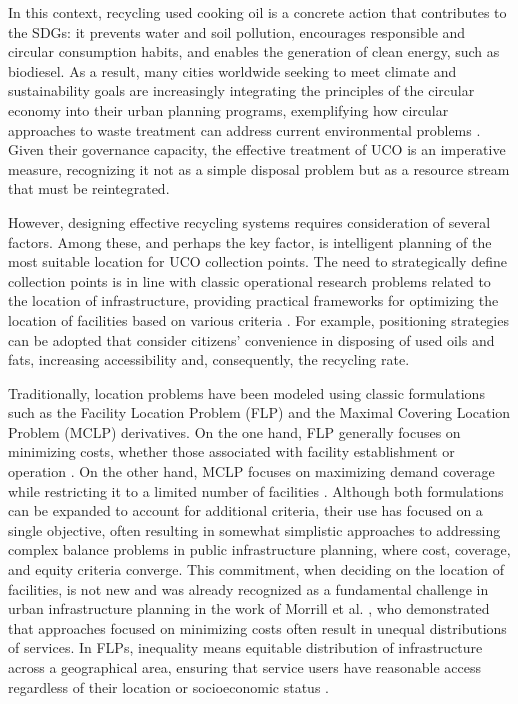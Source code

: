 In this context, recycling used cooking oil is a concrete action that contributes to the SDGs: it prevents water and soil pollution, encourages responsible and circular consumption habits, and enables the generation of clean energy, such as biodiesel. As a result, many cities worldwide seeking to meet climate and sustainability goals are increasingly integrating the principles of the circular economy into their urban planning programs, exemplifying how circular approaches to waste treatment can address current environmental problems \cite{petit2018circular}. Given their governance capacity, the effective treatment of UCO is an imperative measure, recognizing it not as a simple disposal problem but as a resource stream that must be reintegrated. 

However, designing effective recycling systems requires consideration of several factors. Among these, and perhaps the key factor, is intelligent planning of the most suitable location for UCO collection points. The need to strategically define collection points is in line with classic operational research problems related to the location of infrastructure, providing practical frameworks for optimizing the location of facilities 
based on various criteria \cite{gallego2024metaheuristic,hale2003location,karpova2025multi,vecina2025enhancing}. For example, positioning strategies can be adopted that consider citizens' convenience in disposing of used oils and fats, increasing accessibility and, consequently, the recycling rate. 

Traditionally, location problems have been modeled using classic formulations such as the Facility Location Problem (FLP) and the Maximal Covering Location Problem (MCLP) derivatives. On the one hand, FLP generally focuses on minimizing costs, whether those associated with facility establishment or operation \cite{adeleke2020facility}. On the other hand, MCLP focuses on maximizing demand coverage while restricting it to a limited number of facilities \cite{murray2016maximal}. Although both formulations can be expanded to account for additional criteria, their use has focused on a single objective, often resulting in somewhat simplistic approaches to addressing complex balance problems in public infrastructure planning, where cost, coverage, and equity criteria converge. This commitment, when deciding on the location of facilities, is not new and was already recognized as a fundamental challenge in urban infrastructure planning in the work of Morrill et al. \cite{morrill1977efficiency}, who demonstrated that approaches focused on minimizing costs often result in unequal distributions of services. In FLPs, inequality means equitable distribution of infrastructure across a geographical area, ensuring that service users have reasonable access regardless of their location or socioeconomic status \cite{morrill1977efficiency,kunzmann1998planning}.

